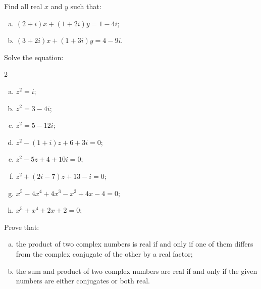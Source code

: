 \begin{problem}
Find all real $x$ and $y$ such that:
\begin{enumerate}[a)]
    \item $(2+i) x+(1+2 i) y=1-4 i$;

    \item $(3+2 i) x+(1+3 i) y=4-9 i$.   
\end{enumerate} 
\end{problem}

\begin{problem}
Solve the equation:
\begin{multicols}{2}
\begin{enumerate}[a)]
\item $z^2=i$;

\item $z^2=3-4 i$;

\item $z^2=5-12 i$;

\item  $z^2-(1+i) z+6+3 i=0$;

\item  $z^2-5 z+4+10 i=0$;

\item $z^2+(2 i-7) z+13-i=0$;

\item $x^5 - 4 x^4 + 4 x^3 - x^2 + 4 x - 4 = 0$;

\item $x^5 + x^4 + 2x + 2 = 0$;
\end{enumerate}
\end{multicols}
\end{problem}

\begin{problem}
Prove that:
\begin{enumerate}[a)]
    \item the product of two complex numbers is real if and only if one of them differs from the complex conjugate of the other by a real factor;

    \item the sum and product of two complex numbers are real if and only if the given numbers are either conjugates or both real.
    \end{enumerate}
\end{problem}

